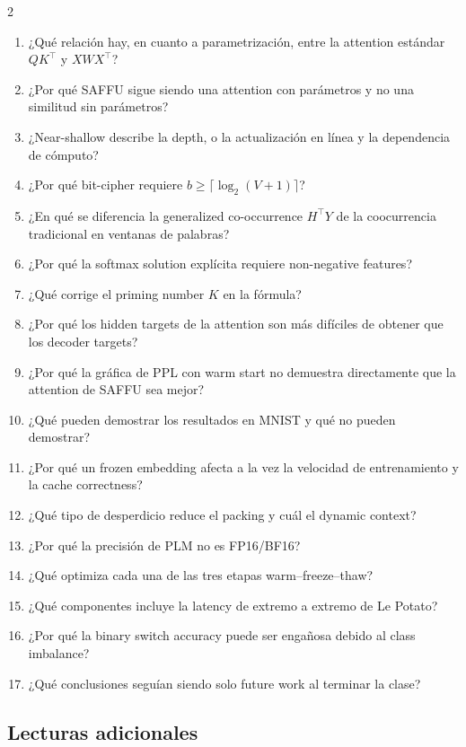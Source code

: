 \documentclass[a4paper]{article}
\begin{document}
\begin{multicols}{2}
\small
\begin{enumerate}
  \item ¿Qué relación hay, en cuanto a parametrización, entre la attention estándar $QK^\top$ y $XWX^\top$?
  \item ¿Por qué SAFFU sigue siendo una attention con parámetros y no una similitud sin parámetros?
  \item ¿Near-shallow describe la depth, o la actualización en línea y la dependencia de cómputo?
  \item ¿Por qué bit-cipher requiere $b\ge\lceil\log_2(V+1)\rceil$?
  \item ¿En qué se diferencia la generalized co-occurrence $H^\top Y$ de la coocurrencia tradicional en ventanas de palabras?
  \item ¿Por qué la softmax solution explícita requiere non-negative features?
  \item ¿Qué corrige el priming number $K$ en la fórmula?
  \item ¿Por qué los hidden targets de la attention son más difíciles de obtener que los decoder targets?
  \item ¿Por qué la gráfica de PPL con warm start no demuestra directamente que la attention de SAFFU sea mejor?
  \item ¿Qué pueden demostrar los resultados en MNIST y qué no pueden demostrar?
  \item ¿Por qué un frozen embedding afecta a la vez la velocidad de entrenamiento y la cache correctness?
  \item ¿Qué tipo de desperdicio reduce el packing y cuál el dynamic context?
  \item ¿Por qué la precisión de PLM no es FP16/BF16?
  \item ¿Qué optimiza cada una de las tres etapas warm--freeze--thaw?
  \item ¿Qué componentes incluye la latency de extremo a extremo de Le Potato?
  \item ¿Por qué la binary switch accuracy puede ser engañosa debido al class imbalance?
  \item ¿Qué conclusiones seguían siendo solo future work al terminar la clase?
\end{enumerate}
\end{multicols}

\subsection{Lecturas adicionales}
\end{document}
